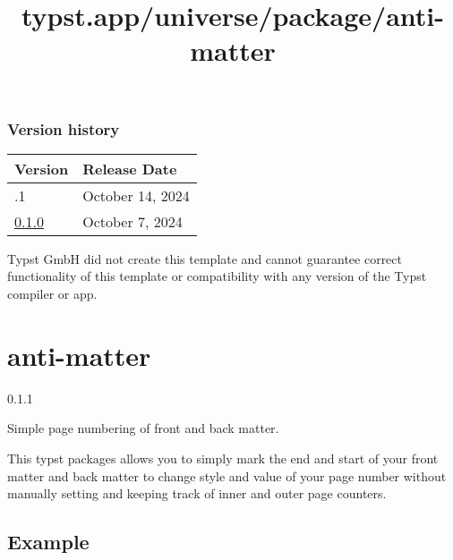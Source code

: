 \label{versions}
\subsubsection{Version history}\label{version-history}

\begin{longtable}[]{@{}ll@{}}
\toprule\noalign{}
Version & Release Date \\
\midrule\noalign{}
\endhead
\bottomrule\noalign{}
\endlastfoot
0.1.1 & October 14, 2024 \\
\href{https://typst.app/universe/package/modern-report-umfds/0.1.0/}{0.1.0}
& October 7, 2024 \\
\end{longtable}

Typst GmbH did not create this template and cannot guarantee correct
functionality of this template or compatibility with any version of the
Typst compiler or app.


\title{typst.app/universe/package/anti-matter}

\label{banner}
\section{anti-matter}\label{anti-matter}

{ 0.1.1 }

Simple page numbering of front and back matter.

\label{readme}
This typst packages allows you to simply mark the end and start of your
front matter and back matter to change style and value of your page
number without manually setting and keeping track of inner and outer
page counters.

\subsection{Example}\label{example}

\begin{Shaded}
\begin{Highlighting}[]






\end{Highlighting}
\end{Shaded}

